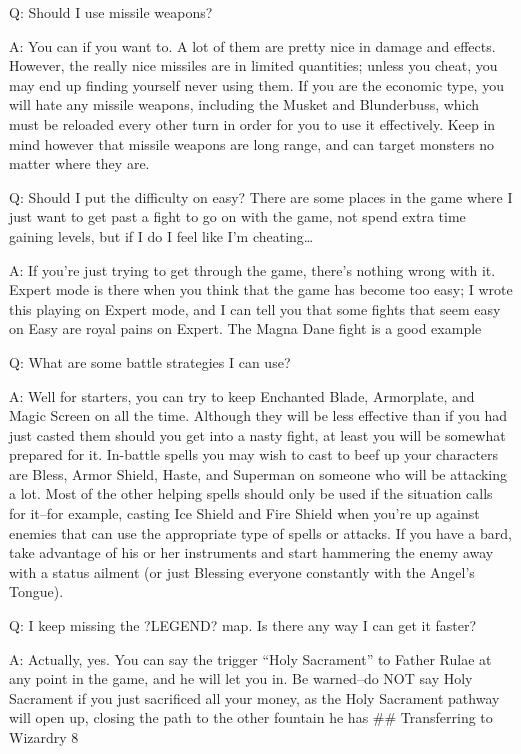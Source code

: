 \documentclass[12pt]{article}
\begin{document}
Q: Should I use missile weapons?

A: You can if you want to. A lot of them are pretty nice in damage and
effects. However, the really nice missiles are in limited quantities;
unless you cheat, you may end up finding yourself never using them. If
you are the economic type, you will hate any missile weapons, including
the Musket and Blunderbuss, which must be reloaded every other turn in
order for you to use it effectively. Keep in mind however that missile
weapons are long range, and can target monsters no matter where they
are.

Q: Should I put the difficulty on easy? There are some places in the
game where I just want to get past a fight to go on with the game, not
spend extra time gaining levels, but if I do I feel like I'm
cheating\ldots{}

A: If you're just trying to get through the game, there's nothing wrong
with it. Expert mode is there when you think that the game has become
too easy; I wrote this playing on Expert mode, and I can tell you that
some fights that seem easy on Easy are royal pains on Expert. The Magna
Dane fight is a good example

Q: What are some battle strategies I can use?

A: Well for starters, you can try to keep Enchanted Blade, Armorplate,
and Magic Screen on all the time. Although they will be less effective
than if you had just casted them should you get into a nasty fight, at
least you will be somewhat prepared for it. In-battle spells you may
wish to cast to beef up your characters are Bless, Armor Shield, Haste,
and Superman on someone who will be attacking a lot. Most of the other
helping spells should only be used if the situation calls for it--for
example, casting Ice Shield and Fire Shield when you're up against
enemies that can use the appropriate type of spells or attacks. If you
have a bard, take advantage of his or her instruments and start
hammering the enemy away with a status ailment (or just Blessing
everyone constantly with the Angel's Tongue).

Q: I keep missing the ?LEGEND? map. Is there any way I can get it
faster?

A: Actually, yes. You can say the trigger ``Holy Sacrament'' to Father
Rulae at any point in the game, and he will let you in. Be warned--do
NOT say Holy Sacrament if you just sacrificed all your money, as the
Holy Sacrament pathway will open up, closing the path to the other
fountain he has \#\# Transferring to Wizardry 8
\end{document}
